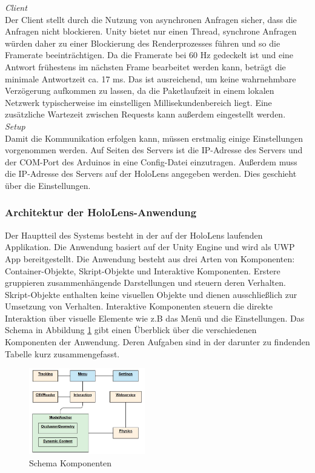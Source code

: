 \textit{Client}\\
Der Client stellt durch die Nutzung von asynchronen Anfragen sicher, dass die Anfragen nicht blockieren. Unity bietet nur einen Thread, synchrone Anfragen würden daher zu einer Blockierung des Renderprozesses führen und so die Framerate beeinträchtigen. Da die Framerate bei 60 Hz gedeckelt ist und eine Antwort frühestens im nächsten Frame bearbeitet werden kann, beträgt die minimale Antwortzeit ca. 17 ms. Das ist ausreichend, um keine wahrnehmbare Verzögerung aufkommen zu lassen, da die Paketlaufzeit in einem lokalen Netzwerk typischerweise im einstelligen Millisekundenbereich liegt. Eine zusätzliche Wartezeit zwischen Requests kann außerdem eingestellt werden.\\

\textit{Setup}\\
Damit die Kommunikation erfolgen kann, müssen erstmalig einige Einstellungen vorgenommen werden. Auf Seiten des Servers ist die IP-Adresse des Servers und der COM-Port des Arduinos in eine Config-Datei einzutragen. Außerdem muss die IP-Adresse des Servers auf der HoloLens angegeben werden. Dies geschieht über die Einstellungen.

\subsubsection{Architektur der HoloLens-Anwendung}
\label{sec-5-1-2}
Der Hauptteil des Systems besteht in der auf der HoloLens laufenden Applikation. Die Anwendung basiert auf der Unity Engine und wird als UWP App bereitgestellt. Die Anwendung besteht aus drei Arten von Komponenten: Container-Objekte, Skript-Objekte und Interaktive Komponenten. Erstere gruppieren zusammenhängende Darstellungen und steuern deren Verhalten. Skript-Objekte enthalten keine visuellen Objekte und dienen ausschließlich zur Umsetzung von Verhalten. Interaktive Komponenten steuern die direkte Interaktion über visuelle Elemente wie z.B das Menü und die Einstellungen. Das Schema in Abbildung \ref{img:components-schema} gibt einen Überblick über die verschiedenen Komponenten der Anwendung. Deren Aufgaben sind in der darunter zu findenden Tabelle kurz zusammengefasst.

\begin{figure}[H]
	\centering
	\includegraphics[width=0.45\textwidth]{images/schema/components.jpg}
	\caption{Schema Komponenten}
	\label{img:components-schema}
\end{figure}


